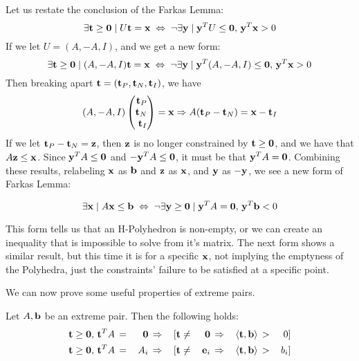 Let us restate the conclusion of the Farkas Lemma:
\newcommand{\xor}{\;\Leftrightarrow\;\neg}
\[ \exists \t\geq\0 \st U\t = \x \xor \exists \y\st \y^TU\leq\0,\, \y^T\x > 0 \]
If we let $U = (A,-A,I)$, and  we get a new form:
\[ \exists \t \geq\0 \st (A,-A,I)\t = \x \xor \exists \y\st \y^T(A,-A,I)\leq\0,\, \y^T\x > 0 \]
Then breaking apart $\mathbf{t} = (\mathbf{t}_P,\mathbf{t}_N,\mathbf{t}_I)$, we have
\[ (A,-A,I)\pmb \t_P\\ \t_N\\ \t_I \pme = \x \Rightarrow A(\t_P - \t_N) = \x - \t_I \]
If we let $\mathbf{t}_P - \mathbf{t}_N = \mathbf{z}$, then $\mathbf{z}$ is no longer constrained by $\mathbf{t} \geq\mathbf{0}$, and we have that $A\mathbf{z} \leq \mathbf{x}$.  Since $\mathbf{y}^T A \leq \mathbf{0}$ and $-\mathbf{y}^T A\leq \mathbf{0}$, it must be that $\mathbf{y}^T A = \mathbf{0}$.  Combining these results, relabeling $\mathbf{x}$ as $\mathbf{b}$ and $\mathbf{z}$ as $\mathbf{x}$, and $\mathbf{y}$ as $-\mathbf{y}$, we see a new form of Farkas Lemma:
\begin{Thm}\label{FL2}
	\[ \exists \x \st A\x \leq \b \xor \exists \y\geq\0 \st \y^TA = \0,\, \y^T\b < 0 \]
\end{Thm}
This form tells us that an H-Polyhedron is non-empty, or we can create an inequality that is impossible to solve from it's matrix.  The next form shows a similar result, but this time it is for a specific $\mathbf{x}$, not implying the emptyness of the Polyhedra, just the constraints' failure to be satisfied at a specific point.
%
%

We can now prove some useful properties of extreme pairs.

\begin{Prop}\label{extreme_Ab_pair_properties}
	Let $A,\mathbf{b}$ be an extreme pair.  Then the following holds:
	\begin{alignat*}{6}
		\mathbf{t}\geq\mathbf{0},\,\mathbf{t}^T A \, & = & \, \mathbf{0}  \, & \Rightarrow & \, [\mathbf{t} & \neq & \, \mathbf{0} \,   & \Rightarrow & \, \left\langle \mathbf{t}, \mathbf{b} \right\rangle \, & > & \, 0 ]   \\
		\mathbf{t}\geq\mathbf{0},\,\mathbf{t}^T A \, & = & \, A_i \, & \Rightarrow & \, [\mathbf{t} & \neq & \, \mathbf{e}_i \, & \Rightarrow & \, \left\langle \mathbf{t}, \mathbf{b} \right\rangle \, & > & \, b_i ]
	\end{alignat*}
\end{Prop}

